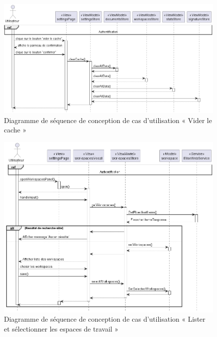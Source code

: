 \begin{figure}[H]
  \centering
  \includegraphics[width=1\textwidth]{out/diagrams/sprint6/sequence_clear_cache/sequence_clear_cache}
  \caption{Diagramme de séquence de conception de cas d'utilisation «  Vider le cache »}
  \label{fig:conception_sequence_clear_cache}
\end{figure}

\begin{figure}[H]
  \centering
  \includegraphics[width=1\textwidth]{out/diagrams/sprint6/sequence_lister_selectionner_workspaces/sequence_lister_selectionner_workspaces}
  \caption{Diagramme de séquence de conception de cas d'utilisation « Lister et sélectionner les espaces de travail »}
  \label{fig:conception_sequence_lister_selectionner_workspaces}
\end{figure}

